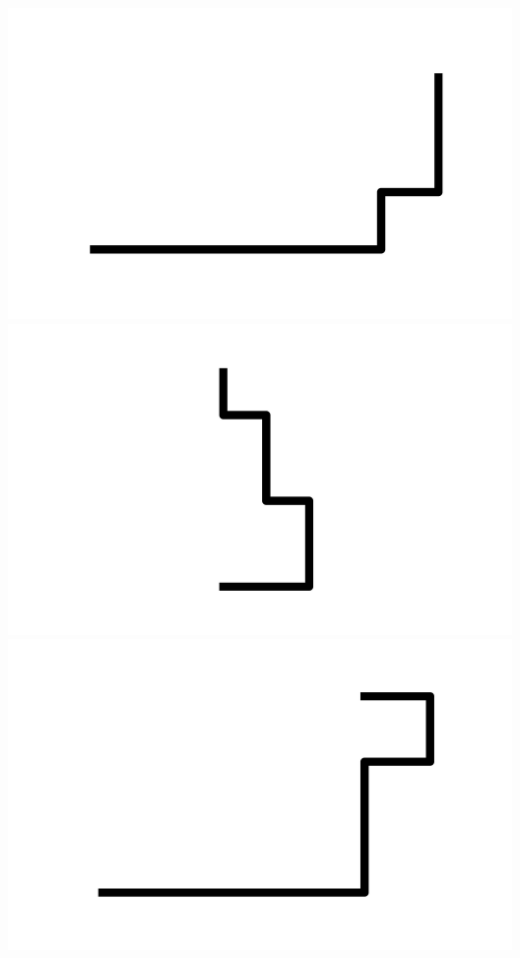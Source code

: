\documentclass[]{report}
\begin{document}
\includegraphics[scale=.1]{pictures/21/state_cluster_shapes_97.pdf} 
\includegraphics[scale=.1]{pictures/21/state_cluster_shapes_98.pdf} 
\includegraphics[scale=.1]{pictures/21/state_cluster_shapes_99.pdf} 
\end{document}
